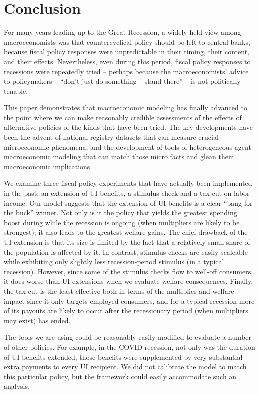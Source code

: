 \documentclass[../HAFiscal]{subfiles}
\begin{document}
\section{Conclusion}

For many years leading up to the Great Recession, a widely held view among macroeconomists was that countercyclical policy should be left to central banks, because fiscal policy responses were unpredictable in their timing, their content, and their effects.  Nevertheless, even during this period, fiscal policy responses to recessions were repeatedly tried -- perhaps because the macroeconomists' advice to policymakers -- ``don't just do something -- stand there'' -- is not politically tenable.

This paper demonstrates that macroeconomic modeling has finally advanced to the point where we can make reasonably credible assessments of the effects of alternative policies of the kinds that have been tried.  The key developments have been the advent of national registry datasets that can measure crucial microeconomic phenomena, and the development of tools of heterogeneous agent macroeconomic modeling that can match those micro facts and glean their macroeconomic implications.

We examine three fiscal policy experiments that have actually been implemented in the past: an extension of UI benefits, a stimulus check and a tax cut on labor income.  Our model suggests that the extension of UI benefits is a clear ``bang for the buck'' winner.  Not only is it the policy that yields the greatest spending boost during while the recession is ongoing (when multipliers are likely to be strongest), it also leads to the greatest welfare gains. The chief drawback of the UI extension is that its size is limited by the fact that a relatively small share of the population is affected by it. In contrast, stimulus checks are easily scaleable while exhibiting only slightly less recession-period stimulus (in a typical recession). However, since some of the stimulus checks flow to well-off consumers, it does worse than UI extensions when we evaluate welfare consequences. Finally, the tax cut is the least effective both in terms of the multiplier and welfare impact since it only targets employed consumers, and for a typical recession more of its payouts are likely to occur after the recessionary period (when multipliers may exist) has ended.

The tools we are using could be reasonably easily modified to evaluate a number of other policies.  For example, in the COVID recession, not only was the duration of UI benefits extended, those benefits were supplemented by very substantial extra payments to every UI recipient.  We did not calibrate the model to match this particular policy, but the framework could easily accommodate such an analysis.
\end{document}
